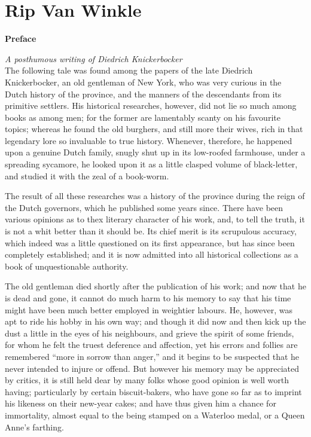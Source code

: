 \chapter{Rip Van Winkle}

\begin{center}
	\textbf{Preface}\\
\end{center}

\noindent\textit{A posthumous writing of Diedrich Knickerbocker}\\

\noindent
The following tale was found among the papers of the late Diedrich Knickerbocker, an old gentleman of New York, who was very curious in the Dutch history of the province, and the manners of the descendants from its primitive settlers. His historical researches, however, did not lie so much among books as among men; for the former are lamentably scanty on his favourite topics; whereas he found the old burghers, and still more their wives, rich in that legendary lore so invaluable to true history. Whenever, therefore, he happened upon a genuine Dutch family, snugly shut up in its low-roofed farmhouse, under a spreading sycamore, he looked upon it as a little clasped volume of black-letter, and studied it with the zeal of a book-worm.

The result of all these researches was a history of the province during the reign of the Dutch governors, which he published some years since. There have been various opinions as to thex literary character of his work, and, to tell the truth, it is not a whit better than it should be. Its chief merit is its scrupulous accuracy, which indeed was a little questioned on its first appearance, but has since been completely established; and it is now admitted into all historical collections as a book of unquestionable authority.

The old gentleman died shortly after the publication of his work; and now that he is dead and gone, it cannot do much harm to his memory to say that his time might have been much better employed in weightier labours. He, however, was apt to ride his hobby in his own way; and though it did now and then kick up the dust a little in the eyes of his neighbours, and grieve the spirit of some friends, for whom he felt the truest deference and affection, yet his errors and follies are remembered “more in sorrow than anger,” and it begins to be suspected that he never intended to injure or offend. But however his memory may be appreciated by critics, it is still held dear by many folks whose good opinion is well worth having; particularly by certain biscuit-bakers, who have gone so far as to imprint his likeness on their new-year cakes; and have thus given him a chance for immortality, almost equal to the being stamped on a Waterloo medal, or a Queen Anne’s farthing.

